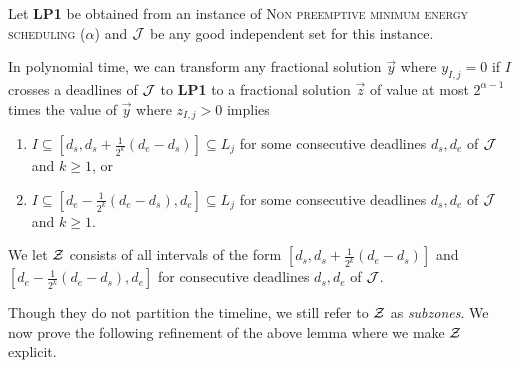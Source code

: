 \begin{lem}\label{lemma:subzones}
  Let \textbf{LP1} be obtained from an instance of \textsc{Non preemptive minimum energy scheduling ($\alpha$)} and $\cal{J}$ be any good independent set for this instance.

  In polynomial time, we can transform any fractional solution $\vec{y}$ where $y_{I,j}=0$ if $I$ crosses a deadlines of $\cal{J}$ to \textbf{LP1} to a fractional solution $\vec{z}$ of value at most $2^{\alpha-1}$ times the value of $\vec{y}$  where $z_{I,j}>0$ implies
  \begin{enumerate}
  \item
    $I \subseteq [d_s, d_s + \frac{1}{2^{k}}(d_e-d_s) ] \subseteq L_j$ for some consecutive deadlines $d_s, d_e$  of $\cal{J}$ and $k \ge 1$, or
  \item
    $I \subseteq [d_e - \frac{1}{2^{k}}(d_e-d_s), d_e ] \subseteq L_j$ for some consecutive deadlines $d_s, d_e$  of $\cal{J}$ and $k \ge 1$.
  \end{enumerate}
\end{lem}

We let ${\cal Z}$ consists of all intervals of the form $[d_s, d_s + \frac{1}{2^{k}}(d_e-d_s) ]$ and $[d_e - \frac{1}{2^{k}}(d_e-d_s), d_e]$ 
for consecutive deadlines $d_s, d_e$ of $\cal{J}$.

Though they do not partition the timeline, we still refer to ${\cal Z}$ as \emph{subzones}. We now prove the following refinement of the above lemma where we make ${\cal Z}$ explicit.


